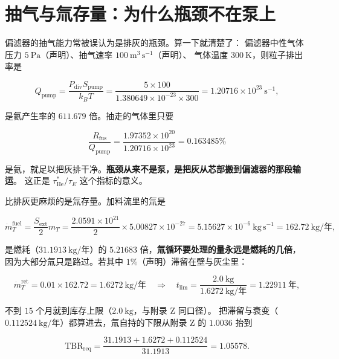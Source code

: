 \section{抽气与氚存量：为什么瓶颈不在泵上}
\label{sec:app-aj-pumping}

偏滤器的抽气能力常被误认为是排灰的瓶颈。算一下就清楚了：
偏滤器中性气体压力 $5\ \mathrm{Pa}$（声明）、抽气速率 $100\ \mathrm{m^{3}\,s^{-1}}$（声明）、
气体温度 $300\ \mathrm{K}$，则粒子排出率是

\begin{equation}
Q_{\mathrm{pump}} = \frac{P_{\mathrm{div}}S_{\mathrm{pump}}}{k_BT}
= \frac{5\times100}{1.380649\times10^{-23}\times300}
= 1.20716\times10^{23}\ \mathrm{s^{-1}},
\label{eq:app-aj-pumpq}
\end{equation}

是氦产生率的 $611.679$ 倍。抽走的气体里只要

\begin{equation}
\frac{R_{\mathrm{fus}}}{Q_{\mathrm{pump}}} = \frac{1.97352\times10^{20}}{1.20716\times10^{23}}
= 0.163485\%
\label{eq:app-aj-hefrac}
\end{equation}

是氦，就足以把灰排干净。\textbf{瓶颈从来不是泵，是把灰从芯部搬到偏滤器的那段输运}。
这正是 $\tau_{\mathrm{He}}^{*}/\tau_E$ 这个指标的意义。

比排灰更麻烦的是氚存量。加料流里的氚是

\begin{equation}
\dot m_T^{\mathrm{fuel}} = \frac{S_{\mathrm{ext}}}{2}m_T
= \frac{2.0591\times10^{21}}{2}\times5.00827\times10^{-27}
= 5.15627\times10^{-6}\ \mathrm{kg\,s^{-1}} = 162.72\ \text{kg/年},
\label{eq:app-aj-inventory}
\end{equation}

是燃耗（$31.1913\ \text{kg/年}$）的 $5.21683$ 倍，\textbf{氚循环要处理的量永远是燃耗的几倍}，
因为大部分氚只是路过。若其中 $1\%$（声明）滞留在壁与灰尘里：

\begin{equation}
\dot m_T^{\mathrm{ret}} = 0.01\times162.72 = 1.6272\ \text{kg/年}
\quad\Longrightarrow\quad
t_{\mathrm{lim}} = \frac{2.0\ \mathrm{kg}}{1.6272\ \text{kg/年}} = 1.22911\ \text{年},
\label{eq:app-aj-inventory2}
\end{equation}

不到 $15$ 个月就到库存上限（$2.0\ \mathrm{kg}$，与附录 Z 同口径）。
把滞留与衰变（$0.112524\ \text{kg/年}$）都算进去，氚自持的下限从附录 Z 的 $1.0036$ 抬到

\begin{equation}
\mathrm{TBR}_{\mathrm{req}} = \frac{31.1913 + 1.6272 + 0.112524}{31.1913} = 1.05578 .
\label{eq:app-aj-tbr}
\end{equation}

